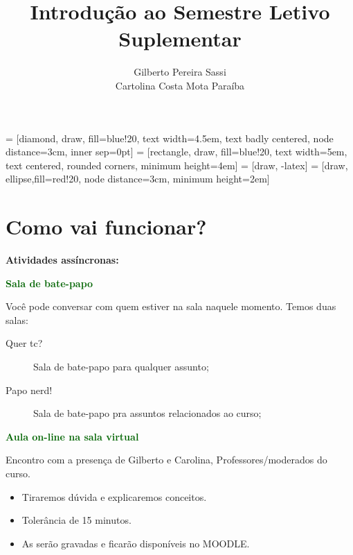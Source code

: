 \documentclass[9pt]{beamer}
\date{}
\title[Boas-vindas!]{Introdução ao Semestre Letivo Suplementar}
\author[Gilberto  e Carolina]{Gilberto Pereira Sassi\\ Cartolina Costa Mota Paraíba}
\institute[IME -- UFBA]{Universidade Federal da Bahia \\ Instituto de Matem\'{a}tica e Estat\'{i}stica\\ Departamento de Estat\'{i}stica }
\begin{document}
	
 = [diamond, draw, fill=blue!20, 
text width=4.5em, text badly centered, node distance=3cm, inner sep=0pt]
 = [rectangle, draw, fill=blue!20, 
text width=5em, text centered, rounded corners, minimum height=4em]
 = [draw, -latex]
 = [draw, ellipse,fill=red!20, node distance=3cm,
minimum height=2em]
	
\begin{frame}{}
	\maketitle
\end{frame}

\section{Como vai funcionar?}

\begin{frame}{}


\textbf{Atividades assíncronas:}
\vfill

\textcolor{darkgreen}{\bf Sala de bate-papo}

Você pode conversar com quem estiver na sala naquele momento. Temos duas salas:


\begin{description}
	\item[Quer tc?] Sala de bate-papo para qualquer assunto;
	\item[Papo nerd!] Sala de bate-papo pra assuntos relacionados ao curso;
\end{description}
\vfill
	
\textcolor{darkgreen}{\bf Aula on-line na sala virtual}
	
Encontro com a presença de Gilberto e Carolina, Professores/moderados do curso.

\begin{itemize}
	\item Tiraremos dúvida e explicaremos conceitos.
	\item Tolerância de 15 minutos.
	\item As serão gravadas e ficarão disponíveis no MOODLE.
\end{itemize}  

\end{frame}
\end{document}
